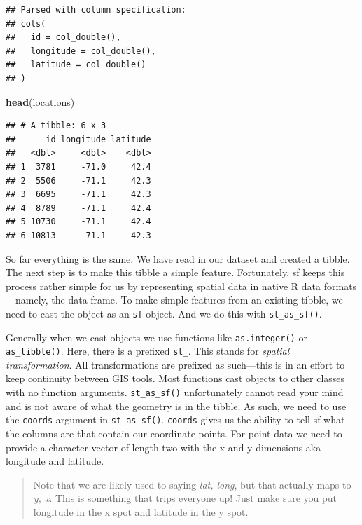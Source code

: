 \documentclass[
]{book}
\newenvironment{Shaded}{\begin{snugshade}}{\end{snugshade}}
\newcommand{\KeywordTok}[1]{\textcolor[rgb]{0.13,0.29,0.53}{\textbf{#1}}}
\newcommand{\NormalTok}[1]{#1}
\begin{document}
\begin{verbatim}
## Parsed with column specification:
## cols(
##   id = col_double(),
##   longitude = col_double(),
##   latitude = col_double()
## )
\end{verbatim}

\begin{Shaded}
\begin{Highlighting}[]
\KeywordTok{head}\NormalTok{(locations)}
\end{Highlighting}
\end{Shaded}

\begin{verbatim}
## # A tibble: 6 x 3
##      id longitude latitude
##   <dbl>     <dbl>    <dbl>
## 1  3781     -71.0     42.4
## 2  5506     -71.1     42.3
## 3  6695     -71.1     42.3
## 4  8789     -71.1     42.4
## 5 10730     -71.1     42.4
## 6 10813     -71.1     42.3
\end{verbatim}

So far everything is the same. We have read in our dataset and created a tibble. The next step is to make this tibble a simple feature. Fortunately, sf keeps this process rather simple for us by representing spatial data in native R data formats---namely, the data frame. To make simple features from an existing tibble, we need to cast the object as an \texttt{sf} object. And we do this with \texttt{st\_as\_sf()}.

Generally when we cast objects we use functions like \texttt{as.integer()} or \texttt{as\_tibble()}. Here, there is a prefixed \texttt{st\_}. This stands for \emph{spatial transformation}. All transformations are prefixed as such---this is in an effort to keep continuity between GIS tools. Most functions cast objects to other classes with no function arguments. \texttt{st\_as\_sf()} unfortunately cannot read your mind and is not aware of what the geometry is in the tibble. As such, we need to use the \texttt{coords} argument in \texttt{st\_as\_sf()}. \texttt{coords} gives us the ability to tell sf what the columns are that contain our coordinate points. For point data we need to provide a character vector of length two with the x and y dimensions aka longitude and latitude.

\begin{quote}
Note that we are likely used to saying \emph{lat, long}, but that actually maps to \emph{y, x}. This is something that trips everyone up! Just make sure you put longitude in the x spot and latitude in the y spot.
\end{quote}
\end{document}
